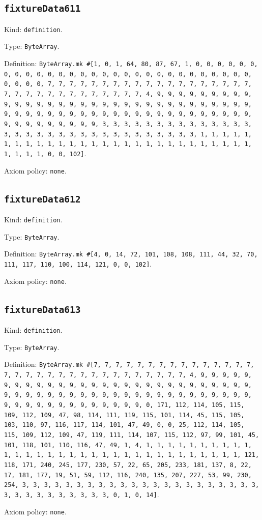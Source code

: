 \documentclass[11pt]{article}
\begin{document}
\subsection*{\texttt{fixtureData611}}
\noindent Kind: \texttt{definition}.\par
\noindent Type: \texttt{ByteArray}.\par
\noindent Definition: \texttt{ByteArray.mk \#[1, 0, 1, 64, 80, 87, 67, 1, 0, 0, 0, 0, 0, 0, 0, 0, 0, 0, 0, 0, 0, 0, 0, 0, 0, 0, 0, 0, 0, 0, 0, 0, 0, 0, 0, 0, 0, 0, 0, 0, 0, 7, 7, 7, 7, 7, 7, 7, 7, 7, 7, 7, 7, 7, 7, 7, 7, 7, 7, 7, 7, 7, 7, 7, 7, 7, 7, 7, 7, 7, 7, 7, 7, 4, 9, 9, 9, 9, 9, 9, 9, 9, 9, 9, 9, 9, 9, 9, 9, 9, 9, 9, 9, 9, 9, 9, 9, 9, 9, 9, 9, 9, 9, 9, 9, 9, 9, 9, 9, 9, 9, 9, 9, 9, 9, 9, 9, 9, 9, 9, 9, 9, 9, 9, 9, 9, 9, 9, 9, 9, 9, 9, 9, 9, 9, 9, 9, 9, 3, 3, 3, 3, 3, 3, 3, 3, 3, 3, 3, 3, 3, 3, 3, 3, 3, 3, 3, 3, 3, 3, 3, 3, 3, 3, 3, 3, 3, 3, 3, 3, 1, 1, 1, 1, 1, 1, 1, 1, 1, 1, 1, 1, 1, 1, 1, 1, 1, 1, 1, 1, 1, 1, 1, 1, 1, 1, 1, 1, 1, 1, 1, 1, 0, 0, 102]}.\par
\noindent Axiom policy: \texttt{none}.\par
\subsection*{\texttt{fixtureData612}}
\noindent Kind: \texttt{definition}.\par
\noindent Type: \texttt{ByteArray}.\par
\noindent Definition: \texttt{ByteArray.mk \#[4, 0, 14, 72, 101, 108, 108, 111, 44, 32, 70, 111, 117, 110, 100, 114, 121, 0, 0, 102]}.\par
\noindent Axiom policy: \texttt{none}.\par
\subsection*{\texttt{fixtureData613}}
\noindent Kind: \texttt{definition}.\par
\noindent Type: \texttt{ByteArray}.\par
\noindent Definition: \texttt{ByteArray.mk \#[7, 7, 7, 7, 7, 7, 7, 7, 7, 7, 7, 7, 7, 7, 7, 7, 7, 7, 7, 7, 7, 7, 7, 7, 7, 7, 7, 7, 7, 7, 7, 7, 4, 9, 9, 9, 9, 9, 9, 9, 9, 9, 9, 9, 9, 9, 9, 9, 9, 9, 9, 9, 9, 9, 9, 9, 9, 9, 9, 9, 9, 9, 9, 9, 9, 9, 9, 9, 9, 9, 9, 9, 9, 9, 9, 9, 9, 9, 9, 9, 9, 9, 9, 9, 9, 9, 9, 9, 9, 9, 9, 9, 9, 9, 9, 9, 9, 0, 171, 112, 114, 105, 115, 109, 112, 109, 47, 98, 114, 111, 119, 115, 101, 114, 45, 115, 105, 103, 110, 97, 116, 117, 114, 101, 47, 49, 0, 0, 25, 112, 114, 105, 115, 109, 112, 109, 47, 119, 111, 114, 107, 115, 112, 97, 99, 101, 45, 101, 118, 101, 110, 116, 47, 49, 1, 4, 1, 1, 1, 1, 1, 1, 1, 1, 1, 1, 1, 1, 1, 1, 1, 1, 1, 1, 1, 1, 1, 1, 1, 1, 1, 1, 1, 1, 1, 1, 1, 1, 121, 118, 171, 240, 245, 177, 230, 57, 22, 65, 205, 233, 181, 137, 8, 22, 17, 181, 177, 19, 51, 59, 112, 116, 240, 135, 207, 227, 53, 99, 230, 254, 3, 3, 3, 3, 3, 3, 3, 3, 3, 3, 3, 3, 3, 3, 3, 3, 3, 3, 3, 3, 3, 3, 3, 3, 3, 3, 3, 3, 3, 3, 3, 3, 0, 1, 0, 14]}.\par
\noindent Axiom policy: \texttt{none}.\par
\end{document}
